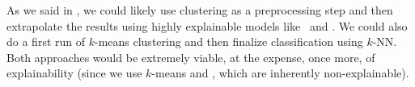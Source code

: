 As we said in , we could likely use clustering as a preprocessing step and then
extrapolate the results using highly explainable models like \dts\ and \rfs. We could also do a
first run of $k$-means clustering and then finalize classification using $k$-NN. Both approaches
would be extremely viable, at the expense, once more, of explainability (since we use $k$-means and
\pca, which are inherently non-explainable).




